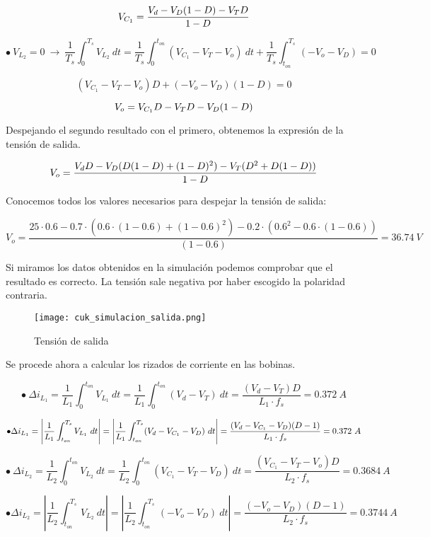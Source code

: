 \documentclass[10pt]{article}
\begin{document}
	$$V_{C_1} = \frac{V_d-V_D(1-D)-V_TD}{1-D}\bigskip$$
	
	$$\bullet\ V_{L_2} = 0 \ \rightarrow\ \frac{1}{T_s}\int_{0}^{T_s}V_{L_2}\ dt= \frac{1}{T_s}\int_{0}^{t_{on}}(V_{C_1}-V_T-V_o)\ dt +\frac{1}{T_s}\int_{t_{on}}^{T_s}(-V_o-V_D)=0$$
	
	$$(V_{C_1}-V_T-V_o)D+(-V_o-V_D)(1-D)=0$$	
	
	$$V_o=V_{C_1}D-V_TD-V_D(1-D)\bigskip$$
	
	Despejando el segundo resultado con el primero, obtenemos la expresión de la tensión de salida.
	
	$$V_o=\frac{V_dD-V_D(D(1-D)+(1-D)^2)-V_T(D^2+D(1-D))}{1-D}\bigskip$$
	
	
	\newpage
	Conocemos todos los valores necesarios para despejar la tensión de salida:
	
	$$V_o=\frac{25\cdot 0.6-0.7\cdot(0.6\cdot(1-0.6)+(1-0.6)^2)-0.2\cdot(0.6^2-0.6\cdot(1-0.6))}{(1-0.6)}= 36.74\ V$$
	
	Si miramos los datos obtenidos en la simulación podemos comprobar que el resultado es correcto. La tensión sale negativa por haber escogido la polaridad contraria.
	
	\begin{figure}[H]
		\begin{center}
			\texttt{[image: cuk\_simulacion\_salida.png]}
		\end{center}\caption{Tensión de salida}
	\end{figure}
	
	Se procede ahora a calcular los rizados de corriente en las bobinas.
	
	$$\bullet\ \Delta{i_{L_1}}=\frac{1}{L_1}\int_{0}^{t_{on}}V_{L_1}\ dt=\frac{1}{L_1}\int_{0}^{t_{on}}(V_d-V_T)\ dt= \frac{(V_d-V_T)D}{L_1\cdot f_s}= 0.372\ A$$
	
	$$\bullet \Delta{i_{L_1}}= \left|\frac{1}{L_1}\int_{t_{on}}^{T_s}V_{L_1}\ dt\right|=\left|\frac{1}{L_1}\int_{t_{on}}^{T_s}(V_d-V_{C_1}-V_D)\ dt\right|= \frac{(V_d-V_{C_1}-V_D)(D-1)}{L_1\cdot f_s}=0.372\ A\bigskip$$
	
	$$\bullet\ \Delta{i_{L_2}}=\frac{1}{L_2}\int_{0}^{t_{on}}V_{L_2}\ dt=\frac{1}{L_2}\int_{0}^{t_{on}}(V_{C_1}-V_T-V_D)\ dt= \frac{(V_{C_1}-V_T-V_o)D}{L_2\cdot f_s}= 0.3684\ A$$
	
	$$\bullet \Delta{i_{L_2}}= \left|\frac{1}{L_2}\int_{t_{on}}^{T_s}V_{L_2}\ dt\right|=\left|\frac{1}{L_2}\int_{t_{on}}^{T_s}(-V_o-V_D)\ dt\right|= \frac{(-V_o-V_D)(D-1)}{L_2\cdot f_s}= 0.3744\ A$$
	
\end{document}

